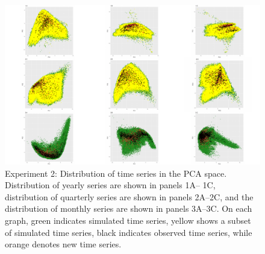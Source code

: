 \documentclass[11pt,a4paper,]{article}
\theoremstyle{definition}
\theoremstyle{definition}
\theoremstyle{definition}
\theoremstyle{remark}
\begin{document}
\begin{figure}

{\centering \includegraphics[width=\textwidth]{figure/exp2-1} 

}

\caption{Experiment 2: Distribution of time series in the PCA space. Distribution of yearly series are shown in panels 1A-- 1C, distribution of quarterly series are shown in panels 2A--2C, and the distribution of monthly series are shown in panels 3A--3C. On each graph, green indicates simulated time series, yellow shows a subset of simulated time series, black indicates observed time series, while orange denotes new time series.}\label{fig:exp2}
\end{figure}
\end{document}
